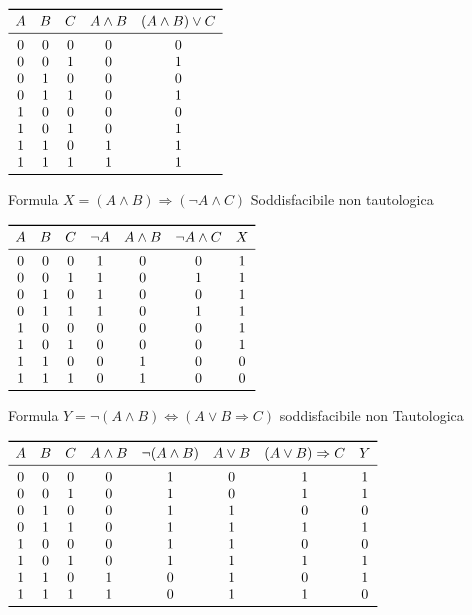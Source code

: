 $\begin{array}{ccccc}
\toprule A & B & C & A \land B & (A \land B) \lor C \\
\midrule
         0 & 0 & 0 & 0 & 0 \\
         0 & 0 & 1 & 0 & 1 \\
         0 & 1 & 0 & 0 & 0 \\
         0 & 1 & 1 & 0 & 1 \\
         1 & 0 & 0 & 0 & 0 \\
         1 & 0 & 1 & 0 & 1 \\
         1 & 1 & 0 & 1 & 1 \\
         1 & 1 & 1 & 1 & 1 \\
\bottomrule
\end{array}$\newline

Formula $X = (A \land B) \Rightarrow (\neg A \land C)$ \quad Soddisfacibile  non tautologica\newline

$\begin{array}{ccccccc}
\toprule A & B & C & \neg A & A \land B & \neg A \land C & X\\
\midrule
         0 & 0 & 0 & 1 & 0 & 0 & 1 \\
         0 & 0 & 1 & 1 & 0 & 1 & 1 \\
         0 & 1 & 0 & 1 & 0 & 0 & 1 \\
         0 & 1 & 1 & 1 & 0 & 1 & 1 \\
         1 & 0 & 0 & 0 & 0 & 0 & 1 \\
         1 & 0 & 1 & 0 & 0 & 0 & 1 \\
         1 & 1 & 0 & 0 & 1 & 0 & 0 \\
         1 & 1 & 1 & 0 & 1 & 0 & 0 \\
\bottomrule
\end{array}$ \newline

Formula $Y = \neg(A \land B) \iff (A \lor B \Rightarrow C)$ soddisfacibile non Tautologica

$\begin{array}{cccccccc}
\toprule
A & B & C & A \land B & \neg(A \land B) & A \lor B & (A \lor B) \Rightarrow C & Y \\
\midrule
0 & 0 & 0 & 0 & 1 & 0 & 1 & 1 \\
0 & 0 & 1 & 0 & 1 & 0 & 1 & 1 \\
0 & 1 & 0 & 0 & 1 & 1 & 0 & 0 \\
0 & 1 & 1 & 0 & 1 & 1 & 1 & 1 \\
1 & 0 & 0 & 0 & 1 & 1 & 0 & 0 \\
1 & 0 & 1 & 0 & 1 & 1 & 1 & 1 \\
1 & 1 & 0 & 1 & 0 & 1 & 0 & 1 \\
1 & 1 & 1 & 1 & 0 & 1 & 1 & 0 \\
\bottomrule
\end{array}$


